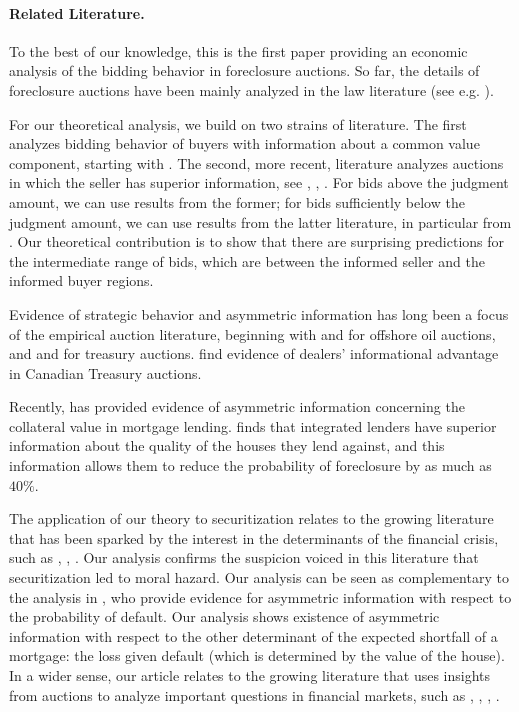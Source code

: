 \documentclass[11pt,twopage]{article}
\begin{document}
\paragraph{Related Literature.} To the best of our knowledge, this is the first paper providing an economic analysis of the bidding behavior in foreclosure auctions. So far, the details of foreclosure auctions have been mainly analyzed in the law literature (see e.g. \cite{nelson2004reforming}).

For our theoretical analysis, we build on two strains of literature. The first analyzes bidding behavior of buyers with information about a common value component, starting with \cite{milgrom1982theory}. The second, more recent, literature analyzes auctions in which the seller has superior information, see \cite{jullien2006auction}, \cite{cai2007reserve}, \cite{lamy}. For bids above the judgment amount, we can use results from the former; for bids sufficiently below the judgment amount, we can use results from the latter literature, in particular from \cite{cai2007reserve}. Our theoretical contribution is to show that there are surprising predictions for the intermediate range of bids, which are between the informed seller and the informed buyer regions.

Evidence of strategic behavior and asymmetric information has long been a focus of the empirical auction literature, beginning with \cite{hendricks1988empirical} and \cite{hendricks2003empirical} for offshore oil auctions, and  \cite{nyborg2002bidder} and \cite{hortaccsu2012valuing} for treasury auctions. \cite{hortaccsu2012valuing} find evidence of dealers' informational advantage in Canadian Treasury auctions.

Recently, \cite{stroebel2013asymmetric} has provided evidence of asymmetric information concerning the collateral value in mortgage lending. \cite{stroebel2013asymmetric} finds that integrated lenders have superior information about the quality of the houses they lend against, and this information allows them to reduce the probability of foreclosure by as much as $40\%$.

The application of our theory to securitization relates to the growing literature that has been sparked by the interest in the determinants of the financial crisis, such as \cite{keys2008did}, \cite{brunnermeier2009deciphering}, \cite{tirole2011illiquidity}. Our analysis confirms the suspicion voiced in this literature that securitization led to moral hazard. Our analysis can be seen as complementary to the analysis in \cite{keys2008did}, who provide evidence for asymmetric information with respect to the probability of default. Our analysis shows existence of asymmetric information with respect to the other determinant of the expected shortfall of a mortgage: the loss given default (which is determined by the value of the house).
In a wider sense, our article relates to the growing literature that uses insights from auctions to analyze important questions  in financial markets, such as \cite{heller1998auctions}, \cite{hortacsu2010mechanism}, 
\cite{cassola20132007},  \cite{zulehner2013competition}.
\end{document}
